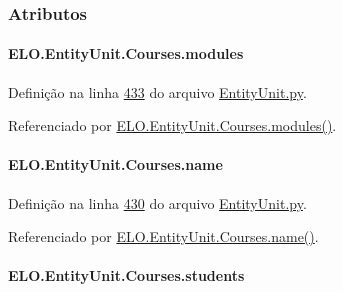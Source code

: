 \subsubsection{Atributos}
\hypertarget{classELO_1_1EntityUnit_1_1Courses_a14bdc53eeb2a7fde8e926cbab6e5206f}{
\paragraph[{modules}]{\setlength{\rightskip}{0pt plus 5cm}E\-L\-O.\-Entity\-Unit.\-Courses.\-modules}}\label{classELO_1_1EntityUnit_1_1Courses_a14bdc53eeb2a7fde8e926cbab6e5206f}


Definição na linha \hyperlink{EntityUnit_8py_source_l00433}{433} do arquivo \hyperlink{EntityUnit_8py_source}{Entity\-Unit.\-py}.



Referenciado por \hyperlink{classELO_1_1EntityUnit_1_1Courses_a5d791876c321c20f5a698273613d0d01}{E\-L\-O.\-Entity\-Unit.\-Courses.\-modules()}.

\hypertarget{classELO_1_1EntityUnit_1_1Courses_aeb94f54ad74895834eb7627dd38e1c8e}{
\paragraph[{name}]{\setlength{\rightskip}{0pt plus 5cm}E\-L\-O.\-Entity\-Unit.\-Courses.\-name}}\label{classELO_1_1EntityUnit_1_1Courses_aeb94f54ad74895834eb7627dd38e1c8e}


Definição na linha \hyperlink{EntityUnit_8py_source_l00430}{430} do arquivo \hyperlink{EntityUnit_8py_source}{Entity\-Unit.\-py}.



Referenciado por \hyperlink{classELO_1_1EntityUnit_1_1Courses_a7b502c0d94108e3c474e5a0e2842cc1d}{E\-L\-O.\-Entity\-Unit.\-Courses.\-name()}.

\hypertarget{classELO_1_1EntityUnit_1_1Courses_ac8e5e595ec895e03b088764d7506e735}{
\paragraph[{students}]{\setlength{\rightskip}{0pt plus 5cm}E\-L\-O.\-Entity\-Unit.\-Courses.\-students}}\label{classELO_1_1EntityUnit_1_1Courses_ac8e5e595ec895e03b088764d7506e735}


